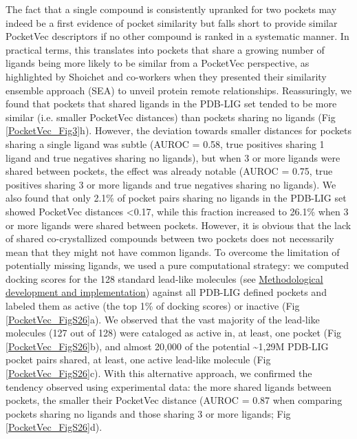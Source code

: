 The fact that a single compound is consistently upranked for two pockets may indeed be a first evidence of pocket similarity but falls short to provide similar PocketVec descriptors if no other compound is ranked in a systematic manner. In practical terms, this translates into pockets that share a growing number of ligands being more likely to be similar from a PocketVec perspective, as highlighted by Shoichet and co-workers when they presented their similarity ensemble approach (SEA) to unveil protein remote relationships\cite{keiser_relating_2007}. Reassuringly, we found that pockets that shared ligands in the PDB-LIG set tended to be more similar (i.e. smaller PocketVec distances) than pockets sharing no ligands (Fig \ref{PocketVec_Fig3}h). However, the deviation towards smaller distances for pockets sharing a single ligand was subtle (AUROC = 0.58, true positives sharing 1 ligand and true negatives sharing no ligands), but when 3 or more ligands were shared between pockets, the effect was already notable (AUROC = 0.75, true positives sharing 3 or more ligands and true negatives sharing no ligands). We also found that only 2.1\% of pocket pairs sharing no ligands in the PDB-LIG set showed PocketVec distances <0.17, while this fraction increased to 26.1\% when 3 or more ligands were shared between pockets. However, it is obvious that the lack of shared co-crystallized compounds between two pockets does not necessarily mean that they might not have common ligands. To overcome the limitation of potentially missing ligands, we used a pure computational strategy: we computed docking scores for the 128 standard lead-like molecules (see \hyperref[PocketVec_MethDevAndImp]{Methodological development and implementation}) against all PDB-LIG defined pockets and labeled them as active (the top 1\% of docking scores) or inactive (Fig \ref{PocketVec_FigS26}a). We observed that the vast majority of the lead-like molecules (127 out of 128) were cataloged as active in, at least, one pocket (Fig \ref{PocketVec_FigS26}b), and almost 20,000 of the potential \textasciitilde1,29M PDB-LIG pocket pairs shared, at least, one active lead-like molecule (Fig \ref{PocketVec_FigS26}c). With this alternative approach, we confirmed the tendency observed using experimental data: the more shared ligands between pockets, the smaller their PocketVec distance (AUROC = 0.87 when comparing pockets sharing no ligands and those sharing 3 or more ligands; Fig \ref{PocketVec_FigS26}d).

